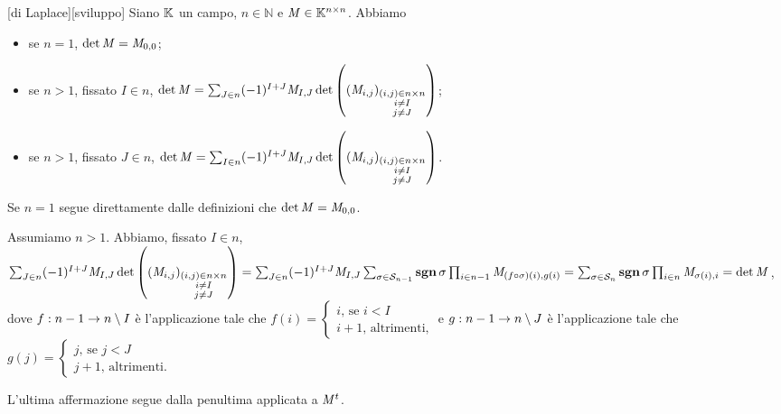 \begin{Theorem}
	[di Laplace][sviluppo] Siano $\mathbb{K}$ un campo, $n \in \mathbb{N}$ e $\mathit{M} \in \mathbb{K}^{n \times n}$. Abbiamo
	\begin{itemize}
		\item se $n = 1$, $\operatorname{det}{\mathit{M}} = \mathit{M}_{0,0}$;
		\item se $n > 1$, fissato $I \in n$, $\operatorname{det}{\mathit{M}} = \sum_{J \in n} (-1)^{I+J} \mathit{M}_{I,J} \operatorname{det} \left ( (\mathit{M}_{i,j})_{\substack{(i,j) \in n \times n\\i \neq I\\j \neq J}} \right )$;
		\item se $n > 1$, fissato $J \in n$, $\operatorname{det}{\mathit{M}} = \sum_{I \in n} (-1)^{I+J} \mathit{M}_{I,J} \operatorname{det} \left ( (\mathit{M}_{i,j})_{\substack{(i,j) \in n \times n\\i \neq I\\j \neq J}} \right )$.
	\end{itemize}
\end{Theorem}
\Proof Se $n = 1$ segue direttamente dalle definizioni che $\operatorname{det}{\mathit{M}} = \mathit{M}_{0,0}$.
\par Assumiamo $n > 1$. Abbiamo, fissato $I \in n$, $\sum_{J \in n} (-1)^{I + J} \Matrix_{I,J} \Determinant \left ( (\Matrix_{i, j})_{\substack{(i,j) \in n \times n\\i \neq I\\j \neq J}} \right ) = \sum_{J \in n} (-1)^{I + J} \Matrix_{I,J} \sum_{\Permutation \in \SymmetricGroup{n - 1}} \PermutationSign{\Permutation} \prod_{i \in n - 1} \Matrix_{(f \circ \Permutation)(i),g(i)} = \sum_{\Permutation \in \SymmetricGroup{n}} \PermutationSign{\Permutation} \prod_{i \in n} \Matrix_{\Permutation(i),i} = \Determinant{\Matrix}$, dove $f: n - 1 \rightarrow n \setminus I$ \`e l'applicazione tale che $f(i) = \begin{cases} i\text{, se }i < I\\i + 1\text{, altrimenti,} \end{cases}$ e $g: n - 1 \rightarrow n \setminus J$ \`e l'applicazione tale che $g(j) = \begin{cases} j\text{, se }j < J\\j + 1\text{, altrimenti.}\end{cases}$
\par L'ultima affermazione segue dalla penultima applicata a ${\mathit{M}}^t$. \EndProof
